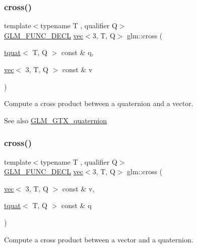 \subsubsection{\texorpdfstring{cross()}{cross()}\hspace{0.1cm}{\footnotesize\ttfamily [1/2]}}
{\footnotesize\ttfamily template$<$typename T , qualifier Q$>$ \\
\hyperlink{setup_8hpp_ab2d052de21a70539923e9bcbf6e83a51}{G\+L\+M\+\_\+\+F\+U\+N\+C\+\_\+\+D\+E\+CL} \hyperlink{structglm_1_1vec}{vec}$<$3, T, Q$>$ glm\+::cross (\begin{DoxyParamCaption}\item[{\hyperlink{structglm_1_1tquat}{tquat}$<$ T, Q $>$ const \&}]{q,  }\item[{\hyperlink{structglm_1_1vec}{vec}$<$ 3, T, Q $>$ const \&}]{v }\end{DoxyParamCaption})}

Compute a cross product between a quaternion and a vector.

\begin{DoxySeeAlso}{See also}
\hyperlink{group__gtx__quaternion}{G\+L\+M\+\_\+\+G\+T\+X\+\_\+quaternion} 
\end{DoxySeeAlso}
\mbox{\label{group__gtx__quaternion_gaa75ca5654e0dc3b61c05db091f7d46ce}} 
\subsubsection{\texorpdfstring{cross()}{cross()}\hspace{0.1cm}{\footnotesize\ttfamily [2/2]}}
{\footnotesize\ttfamily template$<$typename T , qualifier Q$>$ \\
\hyperlink{setup_8hpp_ab2d052de21a70539923e9bcbf6e83a51}{G\+L\+M\+\_\+\+F\+U\+N\+C\+\_\+\+D\+E\+CL} \hyperlink{structglm_1_1vec}{vec}$<$3, T, Q$>$ glm\+::cross (\begin{DoxyParamCaption}\item[{\hyperlink{structglm_1_1vec}{vec}$<$ 3, T, Q $>$ const \&}]{v,  }\item[{\hyperlink{structglm_1_1tquat}{tquat}$<$ T, Q $>$ const \&}]{q }\end{DoxyParamCaption})}

Compute a cross product between a vector and a quaternion.

